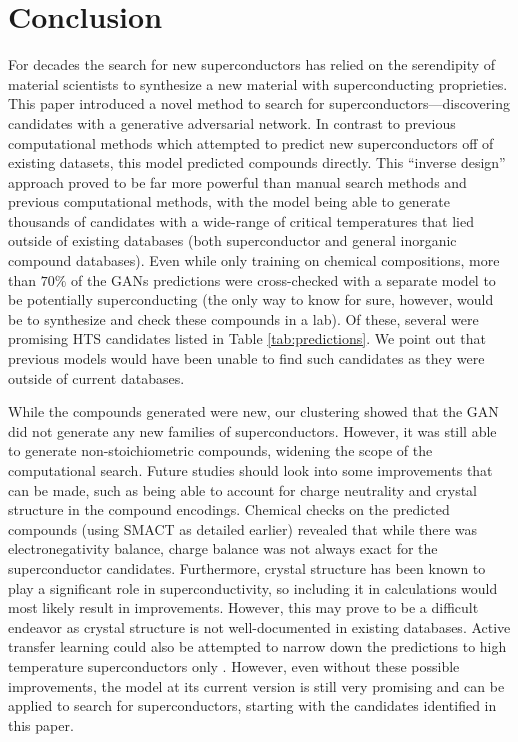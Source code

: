 \section{Conclusion}
\label{conclusions}

For decades the search for new superconductors has relied on the serendipity of material scientists to synthesize a new material with superconducting proprieties. This paper introduced a novel method to search for superconductors---discovering candidates with a generative adversarial network. In contrast to previous computational methods which attempted to predict new superconductors off of existing datasets, this model predicted compounds directly. This ``inverse design'' approach proved to be far more powerful than manual search methods and previous computational methods, with the model being able to generate thousands of candidates with a wide-range of critical temperatures that lied outside of existing databases (both superconductor and general inorganic compound databases). Even while only training on chemical compositions, more than $70\%$ of the GANs predictions were cross-checked with a separate model to be potentially superconducting (the only way to know for sure, however, would be to synthesize and check these compounds in a lab). Of these, several were promising HTS candidates listed in Table \ref{tab:predictions}. We point out that previous models would have been unable to find such candidates as they were outside of current databases.

While the compounds generated were new, our clustering showed that the GAN did not generate any new families of superconductors. However, it was still able to generate non-stoichiometric compounds, widening the scope of the computational search. Future studies should look into some improvements that can be made, such as being able to account for charge neutrality and crystal structure in the compound encodings. Chemical checks on the predicted compounds (using SMACT as detailed earlier) revealed that while there was electronegativity balance, charge balance was not always exact for the superconductor candidates. Furthermore, crystal structure has been known to play a significant role in superconductivity, so including it in calculations would most likely result in improvements. However, this may prove to be a difficult endeavor as crystal structure is not well-documented in existing databases. Active transfer learning could also be attempted to narrow down the predictions to high temperature superconductors only \cite{Kim2021}. However, even without these possible improvements, the model at its current version is still very promising and can be applied to search for superconductors, starting with the candidates identified in this paper.

